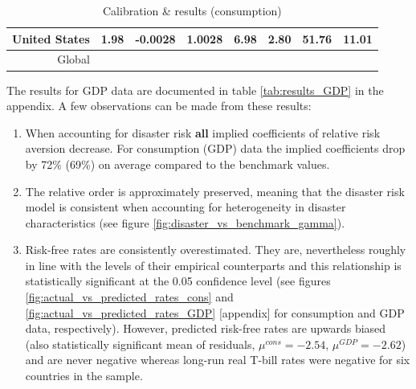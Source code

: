 {\begin{table}[!ht]
\begin{center}
\begin{tabular}{rccccccc}
United States & 1.98 & -0.0028 & 1.0028 & 6.98 & 2.80 & 51.76 &  11.01\\
\hline
Global & & & & & & &\\
\hline 
\hline
\end{tabular} 
\end{center}
\caption{Calibration \& results (consumption)}
\label{tab:results_consumption}
\end{table}
The results for GDP data are documented in table \ref{tab:results_GDP} in the appendix. A few observations can be made from these results:
\begin{enumerate}
    \item When accounting for disaster risk \textbf{all} implied coefficients of relative risk aversion decrease. For consumption (GDP) data the implied coefficients drop by 72\% (69\%) on average compared to the benchmark values.
    \item The relative order is approximately preserved, meaning that the disaster risk model is consistent when accounting for heterogeneity in disaster characteristics (see figure \ref{fig:disaster_vs_benchmark_gamma}).
    \item Risk-free rates are consistently overestimated. They are, nevertheless roughly in line with the levels of their empirical counterparts and this relationship is statistically significant at the 0.05 confidence level (see figures \ref{fig:actual_vs_predicted_rates_cons} and \ref{fig:actual_vs_predicted_rates_GDP} [appendix] for consumption and GDP data, respectively). However, predicted risk-free rates are upwards biased (also statistically significant mean of residuals, $\mu^{cons} = -2.54$, $\mu^{GDP} = -2.62$) and are never negative whereas long-run real T-bill rates were negative for six countries in the sample.

\end{enumerate}}
